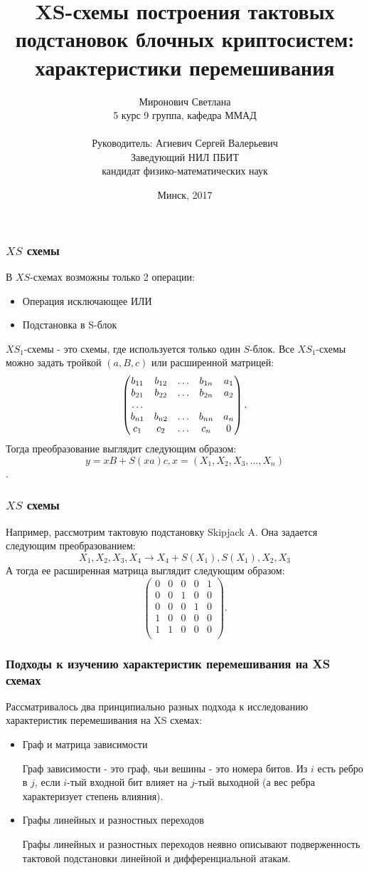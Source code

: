 \documentclass{beamer}
\title[XS-схемы] %
{XS-схемы построения тактовых подстановок блочных криптосистем: характеристики перемешивания}
\author[Миронович С.] %
{Миронович Светлана\\ 5 курс 9 группа, кафедра ММАД\\~ \\Руководитель: Агиевич Сергей Валерьевич \\ Заведующий НИЛ ПБИТ\\ кандидат физико-математических наук}
\institute[БГУ] %
{
  Белорусский государственный университет\\
  Факультет прикладной математики и информатики
}
\date[2017] %
{Минск, 2017}
\begin{document}
\frame{\titlepage}

  \begin{frame}
    \frametitle{$XS$ схемы}
В $XS$-схемах возможны только 2 операции:
\begin{itemize}
\item Операция исключающее ИЛИ
\item Подстановка в S-блок
\end{itemize}
$XS_1$-схемы - это схемы, где используется только один $S$-блок.
Все $XS_1$-схемы можно задать тройкой $(a, B, c)$ или расширенной матрицей:
$$
\begin{pmatrix}
b_{11} & b_{12} & \ldots & b_{1n} & a_1\\
b_{21} & b_{22} & \ldots & b_{2n} & a_2\\
\dotfill\\
b_{n1} & b_{n2} & \ldots & b_{nn} & a_n\\
c_1    & c_2    & \ldots & c_n    & 0\\
\end{pmatrix}.
$$
Тогда преобразование выглядит следующим образом:
$$y = xB + S(xa)c, x = (X_1, X_2, X_3, ..., X_n)$$.
  \end{frame}
 \begin{frame}
    \frametitle{$XS$ схемы}
Например, рассмотрим тактовую подстановку Skipjack A. Она задается следующим преобразованием:
$$X_1, X_2, X_3, X_4 \rightarrow X_4+S(X_1), S(X_1), X_2, X_3$$
А тогда ее расширенная матрица выглядит следующим образом:
$$
\begin{pmatrix}
0 & 0 & 0 & 0 & 1\\
0 & 0 & 1 & 0 & 0\\
0 & 0 & 0 & 1 & 0\\
1 & 0 & 0 & 0 & 0\\
1    & 1    & 0 & 0    & 0\\
\end{pmatrix}.
$$
  \end{frame}

 \begin{frame}
    \frametitle{Подходы к изучению характеристик перемешивания на XS схемах}

Рассматривалось два принципиально разных подхода к исследованию характеристик перемешивания на XS схемах:
\begin{itemize}
\item Граф и матрица зависимости

Граф зависимости - это граф, чьи вешины - это номера битов. Из $i$ есть ребро в $j$, если $i$-тый входной бит влияет на $j$-тый выходной (а вес ребра характеризует степень влияния).
\item Графы линейных и разностных переходов

Графы линейных и разностных переходов неявно описывают подверженность тактовой подстановки линейной и дифференциальной атакам.
\end{itemize}
  \end{frame}
\end{document}
